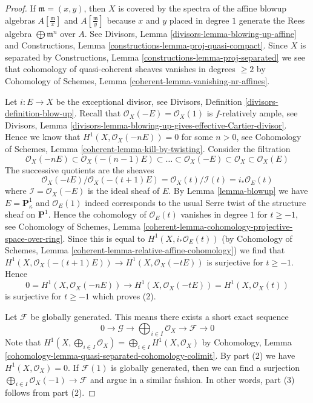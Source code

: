 \begin{proof}
If $\mathfrak m = (x, y)$, then $X$ is covered by the spectra
of the affine blowup algebras $A[\frac{\mathfrak m}{x}]$ and
$A[\frac{\mathfrak m}{y}]$ because $x$ and $y$ placed in degree $1$
generate the Rees algebra $\bigoplus \mathfrak m^n$ over $A$.
See Divisors, Lemma \ref{divisors-lemma-blowing-up-affine} and
Constructions, Lemma \ref{constructions-lemma-proj-quasi-compact}.
Since $X$ is separated by
Constructions, Lemma \ref{constructions-lemma-proj-separated}
we see that cohomology of quasi-coherent sheaves vanishes in
degrees $\geq 2$ by Cohomology of Schemes, Lemma
\ref{coherent-lemma-vanishing-nr-affines}.

\medskip\noindent
Let $i : E \to X$ be the exceptional divisor, see
Divisors, Definition \ref{divisors-definition-blow-up}.
Recall that $\mathcal{O}_X(-E) = \mathcal{O}_X(1)$ is
$f$-relatively ample, see
Divisors, Lemma \ref{divisors-lemma-blowing-up-gives-effective-Cartier-divisor}.
Hence we know that $H^1(X, \mathcal{O}_X(-nE)) = 0$ for some $n > 0$,
see Cohomology of Schemes, Lemma \ref{coherent-lemma-kill-by-twisting}.
Consider the filtration
$$
\mathcal{O}_X(-nE) \subset \mathcal{O}_X(-(n - 1)E) \subset
\ldots \subset \mathcal{O}_X(-E) \subset \mathcal{O}_X \subset \mathcal{O}_X(E)
$$
The successive quotients are the sheaves
$$
\mathcal{O}_X(-t E)/\mathcal{O}_X(-(t + 1)E) =
\mathcal{O}_X(t)/\mathcal{I}(t) =
i_*\mathcal{O}_E(t)
$$
where $\mathcal{I} = \mathcal{O}_X(-E)$ is the ideal sheaf of $E$.
By Lemma \ref{lemma-blowup} we have $E = \mathbf{P}^1_\kappa$ and
$\mathcal{O}_E(1)$ indeed corresponds to the usual Serre twist of
the structure sheaf on $\mathbf{P}^1$. Hence the cohomology
of $\mathcal{O}_E(t)$ vanishes in degree $1$ for $t \geq -1$, see
Cohomology of Schemes, Lemma
\ref{coherent-lemma-cohomology-projective-space-over-ring}.
Since this is equal to $H^1(X, i_*\mathcal{O}_E(t))$ (by
Cohomology of Schemes, Lemma \ref{coherent-lemma-relative-affine-cohomology})
we find that $H^1(X, \mathcal{O}_X(-(t + 1)E)) \to H^1(X, \mathcal{O}_X(-tE))$
is surjective for $t \geq -1$. Hence
$$
0 = H^1(X, \mathcal{O}_X(-nE))
\longrightarrow
H^1(X, \mathcal{O}_X(-tE)) = H^1(X, \mathcal{O}_X(t))
$$
is surjective for $t \geq -1$ which proves (2).

\medskip\noindent
Let $\mathcal{F}$ be globally generated. This means there exists
a short exact sequence
$$
0 \to \mathcal{G} \to \bigoplus\nolimits_{i \in I} \mathcal{O}_X
\to \mathcal{F} \to 0
$$
Note that $H^1(X, \bigoplus_{i \in I} \mathcal{O}_X) =
\bigoplus_{i \in I} H^1(X, \mathcal{O}_X)$ by
Cohomology, Lemma \ref{cohomology-lemma-quasi-separated-cohomology-colimit}.
By part (2) we have $H^1(X, \mathcal{O}_X) = 0$.
If $\mathcal{F}(1)$ is globally generated, then we can find a
surjection $\bigoplus_{i \in I} \mathcal{O}_X(-1) \to \mathcal{F}$
and argue in a similar fashion.
In other words, part (3) follows from part (2).


\end{proof}
